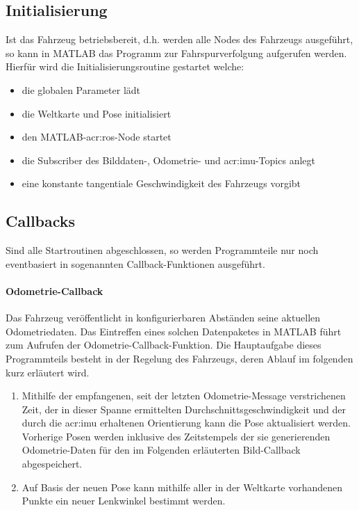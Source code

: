 \subsection{Initialisierung}
Ist das Fahrzeug betriebsbereit, d.h. werden alle Nodes des Fahrzeugs ausgeführt, so kann in MATLAB das Programm zur Fahrspurverfolgung aufgerufen werden. Hierfür wird die Initialisierungsroutine gestartet welche:
\begin{itemize}
\item die globalen Parameter lädt
\item die Weltkarte und Pose initialisiert
\item den MATLAB-\gls{acr:ros}-Node startet
\item die Subscriber des Bilddaten-, Odometrie- und \gls{acr:imu}-Topics anlegt
\item eine konstante tangentiale Geschwindigkeit des Fahrzeugs vorgibt 
\end{itemize}

\subsection{Callbacks}
\label{ssec:software_struktur:matlab:callbacks}
Sind alle Startroutinen abgeschlossen, so werden Programmteile nur noch eventbasiert in sogenannten Callback-Funktionen ausgeführt.
 
\paragraph{Odometrie-Callback}
Das Fahrzeug veröffentlicht in konfigurierbaren Abständen seine aktuellen Odometriedaten.
Das Eintreffen eines solchen Datenpaketes in MATLAB führt zum Aufrufen der Odometrie-Callback-Funktion. Die Hauptaufgabe dieses Programmteils besteht in der Regelung des Fahrzeugs, deren Ablauf im folgenden kurz erläutert wird.
\begin{enumerate}
\item Mithilfe der empfangenen, seit der letzten Odometrie-Message verstrichenen Zeit, der in dieser Spanne ermittelten Durchschnittsgeschwindigkeit und der durch die \gls{acr:imu} erhaltenen Orientierung kann die Pose aktualisiert werden. Vorherige Posen werden inklusive des Zeitstempels der sie generierenden Odometrie-Daten für den im Folgenden erläuterten Bild-Callback abgespeichert.
\item Auf Basis der neuen Pose kann mithilfe aller in der Weltkarte vorhandenen Punkte ein neuer Lenkwinkel bestimmt werden.
\end{enumerate}
